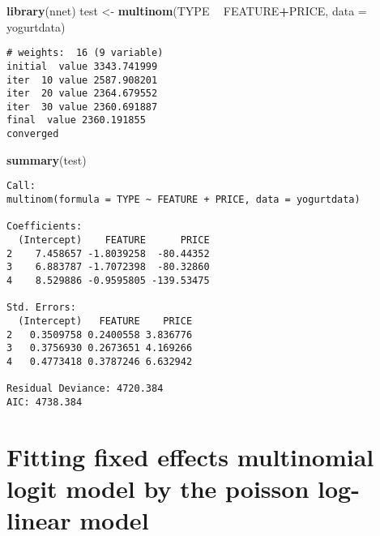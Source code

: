 \documentclass[]{book}
\newenvironment{Shaded}{\begin{snugshade}}{\end{snugshade}}
\newcommand{\CommentTok}[1]{\textcolor[rgb]{0.56,0.35,0.01}{\textit{#1}}}
\newcommand{\DataTypeTok}[1]{\textcolor[rgb]{0.13,0.29,0.53}{#1}}
\newcommand{\DecValTok}[1]{\textcolor[rgb]{0.00,0.00,0.81}{#1}}
\newcommand{\KeywordTok}[1]{\textcolor[rgb]{0.13,0.29,0.53}{\textbf{#1}}}
\newcommand{\NormalTok}[1]{#1}
\newcommand{\OperatorTok}[1]{\textcolor[rgb]{0.81,0.36,0.00}{\textbf{#1}}}
\newcommand{\StringTok}[1]{\textcolor[rgb]{0.31,0.60,0.02}{#1}}
\begin{document}
\begin{Shaded}
\begin{Highlighting}[]
\KeywordTok{library}\NormalTok{(nnet)}
\NormalTok{test <-}\StringTok{ }\KeywordTok{multinom}\NormalTok{(TYPE }\OperatorTok{~}\StringTok{ }\NormalTok{FEATURE}\OperatorTok{+}\NormalTok{PRICE, }\DataTypeTok{data =}\NormalTok{ yogurtdata)}
\end{Highlighting}
\end{Shaded}

\begin{verbatim}
# weights:  16 (9 variable)
initial  value 3343.741999 
iter  10 value 2587.908201
iter  20 value 2364.679552
iter  30 value 2360.691887
final  value 2360.191855 
converged
\end{verbatim}

\begin{Shaded}
\begin{Highlighting}[]
\KeywordTok{summary}\NormalTok{(test)}
\end{Highlighting}
\end{Shaded}

\begin{verbatim}
Call:
multinom(formula = TYPE ~ FEATURE + PRICE, data = yogurtdata)

Coefficients:
  (Intercept)    FEATURE      PRICE
2    7.458657 -1.8039258  -80.44352
3    6.883787 -1.7072398  -80.32860
4    8.529886 -0.9595805 -139.53475

Std. Errors:
  (Intercept)   FEATURE    PRICE
2   0.3509758 0.2400558 3.836776
3   0.3756930 0.2673651 4.169266
4   0.4773418 0.3787246 6.632942

Residual Deviance: 4720.384 
AIC: 4738.384 
\end{verbatim}

\hypertarget{fitting-fixed-effects-multinomial-logit-model-by-the-poisson-log-linear-model}{%
\section{Fitting fixed effects multinomial logit model by the poisson log-linear model}\label{fitting-fixed-effects-multinomial-logit-model-by-the-poisson-log-linear-model}}

\begin{Shaded}
\end{Shaded}
\end{document}
